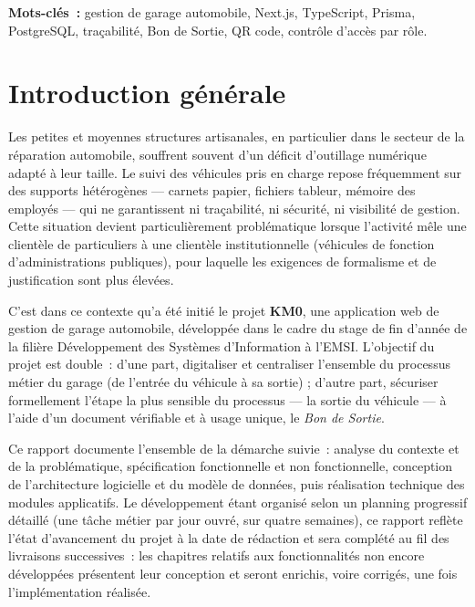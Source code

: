 \documentclass[11pt,a4paper]{report}
\newcommand{\ecoleSigle}{EMSI}
\begin{document}
\textbf{Mots-clés~:} gestion de garage automobile, Next.js, TypeScript, Prisma, PostgreSQL,
traçabilité, Bon de Sortie, QR code, contrôle d'accès par rôle.

\clearpage

\tableofcontents
\clearpage

\chapter{Introduction générale}

Les petites et moyennes structures artisanales, en particulier dans le secteur de la
réparation automobile, souffrent souvent d'un déficit d'outillage numérique adapté à leur
taille. Le suivi des véhicules pris en charge repose fréquemment sur des supports
hétérogènes --- carnets papier, fichiers tableur, mémoire des employés --- qui ne
garantissent ni traçabilité, ni sécurité, ni visibilité de gestion. Cette situation devient
particulièrement problématique lorsque l'activité mêle une clientèle de particuliers à une
clientèle institutionnelle (véhicules de fonction d'administrations publiques), pour
laquelle les exigences de formalisme et de justification sont plus élevées.

C'est dans ce contexte qu'a été initié le projet \textbf{KM0}, une application web de
gestion de garage automobile, développée dans le cadre du stage de fin d'année de la
filière Développement des Systèmes d'Information à l'\ecoleSigle. L'objectif du projet est
double~: d'une part, digitaliser et centraliser l'ensemble du processus métier du garage
(de l'entrée du véhicule à sa sortie) ; d'autre part, sécuriser formellement l'étape la
plus sensible du processus --- la sortie du véhicule --- à l'aide d'un document
vérifiable et à usage unique, le \emph{Bon de Sortie}.

Ce rapport documente l'ensemble de la démarche suivie~: analyse du contexte et de la
problématique, spécification fonctionnelle et non fonctionnelle, conception de
l'architecture logicielle et du modèle de données, puis réalisation technique des modules
applicatifs. Le développement étant organisé selon un planning progressif détaillé
(une tâche métier par jour ouvré, sur quatre semaines), ce rapport reflète l'état
d'avancement du projet à la date de rédaction et sera complété au fil des livraisons
successives~: les chapitres relatifs aux fonctionnalités non encore développées
présentent leur conception et seront enrichis, voire corrigés, une fois l'implémentation
réalisée.
\end{document}
